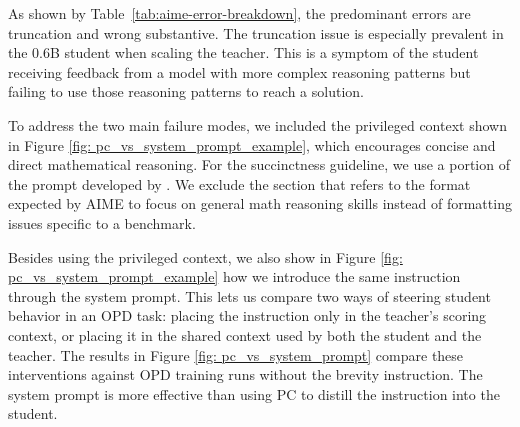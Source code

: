 As shown by Table~\ref{tab:aime-error-breakdown}, the predominant errors are truncation and wrong substantive. The truncation issue is especially prevalent in the 0.6B student when scaling the teacher. This is a symptom of the student receiving feedback from a model with more complex reasoning patterns but failing to use those reasoning patterns to reach a solution.

\begin{table}[ht]
  \centering
  \caption{Share of incorrect attempts (\% of incorrect) per error category in AIME25.}
  \label{tab:aime-error-breakdown}
\end{table}

To address the two main failure modes, we included the privileged context shown in Figure \ref{fig: pc_vs_system_prompt_example}, which encourages concise and direct mathematical reasoning. For the succinctness guideline, we use a portion of the prompt developed by \cite{sang2026CRISPCompressedReasoning}. We exclude the section that refers to the format expected by AIME to focus on general math reasoning skills instead of formatting issues specific to a benchmark.

Besides using the privileged context, we also show in Figure \ref{fig: pc_vs_system_prompt_example} how we introduce the same instruction through the system prompt. This lets us compare two ways of steering student behavior in an OPD task: placing the instruction only in the teacher's scoring context, or placing it in the shared context used by both the student and the teacher. The results in Figure \ref{fig: pc_vs_system_prompt} compare these interventions against OPD training runs without the brevity instruction. The system prompt is more effective than using PC to distill the instruction into the student.

